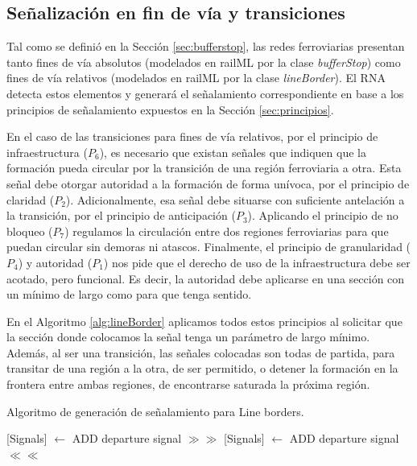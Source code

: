 \subsection{Señalización en fin de vía y transiciones}
    

    Tal como se definió en la Sección \ref{sec:bufferstop}, las redes ferroviarias presentan tanto fines de vía absolutos (modelados en railML por la clase \textit{bufferStop}) como fines de vía relativos (modelados en railML por la clase \textit{lineBorder}). El RNA detecta estos elementos y generará el señalamiento correspondiente en base a los principios de señalamiento expuestos en la Sección \ref{sec:principios}.

    En el caso de las transiciones para fines de vía relativos, por el principio de infraestructura ($P_6$), es necesario que existan señales que indiquen que la formación pueda circular por la transición de una región ferroviaria a otra. Esta señal debe otorgar autoridad a la formación de forma unívoca, por el principio de claridad ($P_2$). Adicionalmente, esa señal debe situarse con suficiente antelación a la transición, por el principio de anticipación ($P_3$). Aplicando el principio de no bloqueo ($P_7$) regulamos la circulación entre dos regiones ferroviarias para que puedan circular sin demoras ni atascos. Finalmente, el principio de granularidad ($P_4$) y autoridad ($P_1$) nos pide que el derecho de uso de la infraestructura debe ser acotado, pero funcional. Es decir, la autoridad debe aplicarse en una sección con un mínimo de largo como para que tenga sentido. 

    En el Algoritmo \ref{alg:lineBorder} aplicamos todos estos principios al solicitar que la sección donde colocamos la señal tenga un parámetro de largo mínimo. Además, al ser una transición, las señales colocadas son todas de partida, para transitar de una región a la otra, de ser permitido, o detener la formación en la frontera entre ambas regiones, de encontrarse saturada la próxima región.
    
    \begin{algorithm}[H]
        \caption{Algoritmo de generación de señalamiento para Line borders.}\label{alg:lineBorder}
        \DontPrintSemicolon
        \SetNoFillComment
        \LinesNotNumbered 
        {
            {
                {
                    [Signals] $\gets$ ADD departure signal $\gg\gg$\;
                }
                {
                    [Signals] $\gets$ ADD departure signal $\ll\ll$\;
                }
            }
        }
        \KwResult{[Signals]} 
    \end{algorithm}


